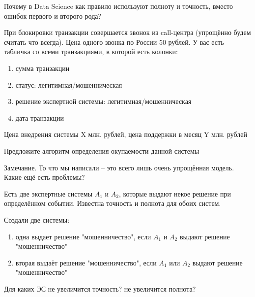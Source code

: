 \begin{frame}
	Почему в Data Science как правило используют полноту и точность, вместо ошибок первого и второго рода?
\end{frame}

\begin{frame}
	\small
	При блокировки транзакции совершается звонок из call-центра (упрощённо будем считать что всегда). 
	Цена одного звонка по России 50 рублей. У вас есть табличка со всеми транзакциями, в которой есть колонки:
	\begin{enumerate}
		\item сумма транзакции
		\item статус: легитимная/мошенническая
		\item решение экспертной системы: легитимная/мошенническая
		\item дата транзакции
	\end{enumerate}

	Цена внедрения системы X млн. рублей, цена поддержки в месяц Y млн. рублей
	
	Предложите алгоритм определения окупаемости данной системы
	
	\begin{block}{Замечание.}
		То что мы написали -- это всего лишь очень упрощённая модель. Какие ещё есть проблемы?
	\end{block}	
	
\end{frame}
  
\begin{frame}
	Есть две экспертные системы $A_1$ и $A_2$, которые выдают некое решение при определённом событии. 
	Известна точность и полнота для обоих систем.
	
	Создали две системы: 
	\begin{enumerate}
		\item одна выдает решение "мошенничество", если $A_1$ и $A_2$ выдают решение "мошенничество"
		\item вторая выдаёт решение "мошенничество", если $A_1$ или $A_2$ выдают решение "мошенничество"
	\end{enumerate}
	
	Для каких ЭС не увеличится точность? не увеличится полнота?
	
\end{frame}


